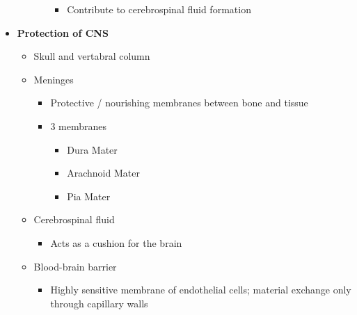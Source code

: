 \documentclass[11pt]{article}
\begin{document}
\begin{itemize}
\begin{itemize}
\begin{itemize}
\begin{itemize}
\item Contribute to cerebrospinal fluid formation
\end{itemize}
\end{itemize}
\end{itemize} 
\item \textbf{Protection of CNS}
\begin{itemize}
\item Skull and vertabral column
\item Meninges
\begin{itemize}
\item Protective / nourishing membranes between bone and tissue
\item 3 membranes
\begin{itemize}
\item Dura Mater
\item Arachnoid Mater
\item Pia Mater
\end{itemize}
\end{itemize}
\item Cerebrospinal fluid
\begin{itemize}
\item Acts as a cushion for the brain
\end{itemize}
\item Blood-brain barrier
\begin{itemize}
\item Highly sensitive membrane of endothelial cells; material exchange only through capillary walls
\end{itemize}
\end{itemize}
\end{itemize}
\end{document}
